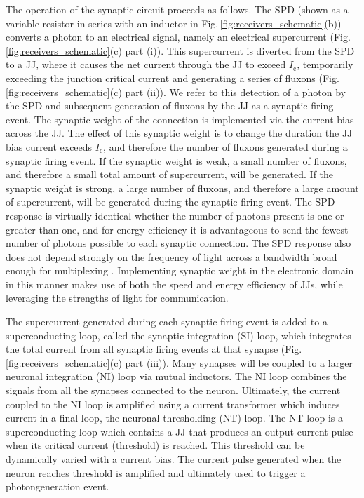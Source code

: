 \documentclass[twocolumn]{article}
\begin{document}
The operation of the synaptic circuit proceeds as follows. The SPD (shown as a variable resistor in series with an inductor in Fig.\,\ref{fig:receivers_schematic}(b)) converts a photon to an electrical signal, namely an electrical supercurrent (Fig.\,\ref{fig:receivers_schematic}(c) part (i)). This supercurrent is diverted from the SPD to a JJ, where it causes the net current through the JJ to exceed $I_{\mathrm{c}}$, temporarily exceeding the junction critical current and generating a series of fluxons (Fig.\,\ref{fig:receivers_schematic}(c) part (ii)). We refer to this detection of a photon by the SPD and subsequent generation of fluxons by the JJ as a synaptic firing event. The synaptic weight of the connection is implemented via the current bias across the JJ. The effect of this synaptic weight is to change the duration the JJ bias current exceeds $I_{\mathrm{c}}$, and therefore the number of fluxons generated during a synaptic firing event. If the synaptic weight is weak, a small number of fluxons, and therefore a small total amount of supercurrent, will be generated. If the synaptic weight is strong, a large number of fluxons, and therefore a large amount of supercurrent, will be generated during the synaptic firing event. The SPD response is virtually identical whether the number of photons present is one or greater than one, and for energy efficiency it is advantageous to send the fewest number of photons possible to each synaptic connection. The SPD response also does not depend strongly on the frequency of light across a bandwidth broad enough for multiplexing \cite{mave2013}. Implementing synaptic weight in the electronic domain in this manner makes use of both the speed and energy efficiency of JJs, while leveraging the strengths of light for communication.  

The supercurrent generated during each synaptic firing event is added to a superconducting loop, called the synaptic integration (SI) loop, which integrates the total current from all synaptic firing events at that synapse (Fig.\,\ref{fig:receivers_schematic}(c) part (iii)). Many synapses will be coupled to a larger neuronal integration (NI) loop via mutual inductors. The NI loop combines the signals from all the synapses connected to the neuron. Ultimately, the current coupled to the NI loop is amplified using a current transformer which induces current in a final loop, the neuronal thresholding (NT) loop. The NT loop is a superconducting loop which contains a JJ that produces an output current pulse when its critical current (threshold) is reached. This threshold can be dynamically varied with a current bias. The current pulse generated when the neuron reaches threshold is amplified and ultimately used to trigger a photon\textendash generation event.
\end{document}
